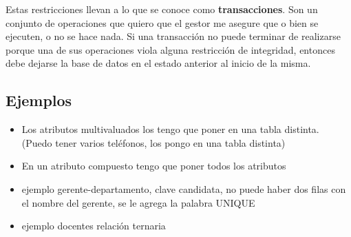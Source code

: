 Estas restricciones llevan a lo que se conoce como \textbf{transacciones}. Son un conjunto de operaciones que quiero que el gestor me asegure que o bien se ejecuten, o no se hace nada. Si una transacción no puede terminar de realizarse porque una de sus operaciones viola alguna restricción de integridad, entonces debe dejarse la base de datos en el estado anterior al inicio de la misma.



\subsection*{Ejemplos}
\begin{itemize}
\item Los atributos multivaluados los tengo que poner en una tabla distinta. (Puedo tener varios teléfonos, los pongo en una tabla distinta)
\item En un atributo compuesto tengo que poner todos los atributos
\item ejemplo gerente-departamento, clave candidata, no puede haber dos filas con el nombre del gerente, se le agrega la palabra UNIQUE
\item ejemplo docentes relación ternaria
\end{itemize}

